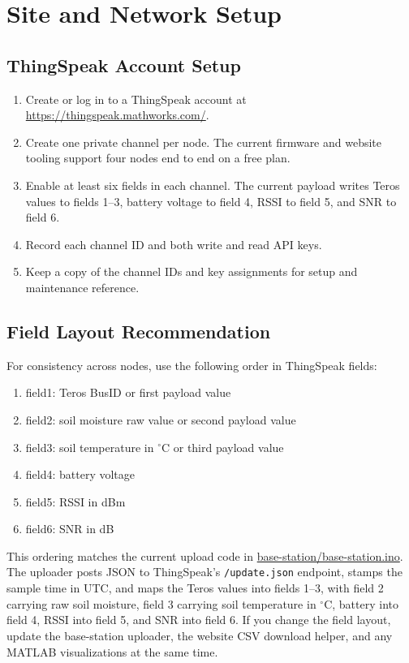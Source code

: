 \documentclass[11pt]{article}
\newcommand{\link}[1]{\url{#1}}
\newcommand{\basefirmware}{\href{https://github.com/benjamenm03/teros12-LoRa/blob/main/base-station/base-station.ino}{base-station/base-station.ino}}
\begin{document}
\section{Site and Network Setup}
\subsection{ThingSpeak Account Setup}
\begin{enumerate}
    \item Create or log in to a ThingSpeak account at \link{https://thingspeak.mathworks.com/}.
    \item Create one private channel per node. The current firmware and website tooling support four nodes end to end on a free plan.
    \item Enable at least six fields in each channel. The current payload writes Teros values to fields 1--3, battery voltage to field 4, RSSI to field 5, and SNR to field 6.
    \item Record each channel ID and both write and read API keys.
    \item Keep a copy of the channel IDs and key assignments for setup and maintenance reference.
\end{enumerate}

\subsection{Field Layout Recommendation}
For consistency across nodes, use the following order in ThingSpeak fields:
\begin{enumerate}
    \item field1: Teros BusID or first payload value
    \item field2: soil moisture raw value or second payload value
    \item field3: soil temperature in $^\circ$C or third payload value
    \item field4: battery voltage
    \item field5: RSSI in dBm
    \item field6: SNR in dB
\end{enumerate}

This ordering matches the current upload code in \basefirmware{}. The uploader posts JSON to ThingSpeak's \texttt{/update.json} endpoint, stamps the sample time in UTC, and maps the Teros values into fields 1--3, with field 2 carrying raw soil moisture, field 3 carrying soil temperature in $^\circ$C, battery into field 4, RSSI into field 5, and SNR into field 6. If you change the field layout, update the base-station uploader, the website CSV download helper, and any MATLAB visualizations at the same time.
\end{document}

